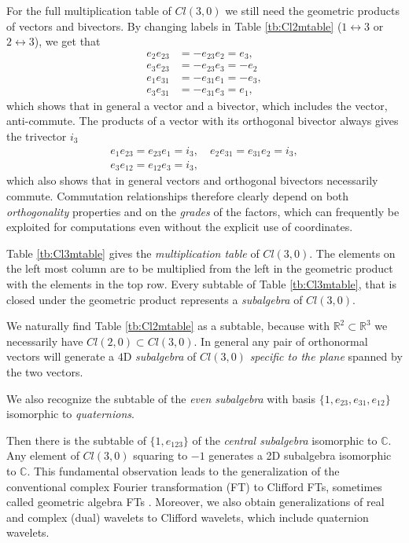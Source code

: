 \documentclass[cameraready]{jcmsi}%
\newcommand{\R}{\mathbb{R}}
\newcommand{\C}{\mathbb{C}}
\begin{document}
For the full multiplication table of $Cl(3,0)$ we still need the geometric products of vectors and bivectors. By changing labels in Table \ref{tb:Cl2mtable} ($1 \leftrightarrow 3$ or $2 \leftrightarrow 3$), we get that
\begin{align} 
  e_2 e_{23} &= - e_{23}e_2 = e_3, 
  \nonumber \\
  e_3 e_{23} &= - e_{23}e_3 = -e_2
  \\
  e_1 e_{31} &= - e_{31}e_1 = -e_3, 
  \nonumber \\
  e_3 e_{31} &= - e_{31}e_3 = e_1,
\end{align} 
which shows that in general a vector and a bivector, which includes the vector, anti-commute. 
The products of a vector with its orthogonal bivector always gives the trivector $i_3$
\begin{gather} 
  e_1 e_{23} = e_{23}e_1 = i_3, \quad
  e_2 e_{31} = e_{31}e_2 = i_3,
  \nonumber \\
  e_3 e_{12} = e_{12}e_3 = i_3,
\end{gather} 
which also shows that in general vectors and orthogonal bivectors necessarily commute. 
Commutation relationships therefore clearly depend on both \textit{orthogonality} properties and on the \textit{grades} of the factors, which can frequently be exploited for computations even without the explicit use of coordinates. 

Table \ref{tb:Cl3mtable} gives the \textit{multiplication table} of $Cl(3,0)$. The elements on the left most column are to be multiplied from the left in the geometric product with the elements in the top row. 
Every subtable of Table \ref{tb:Cl3mtable}, that is closed under the geometric product represents a \textit{subalgebra} of $Cl(3,0)$. 

We naturally find Table \ref{tb:Cl2mtable} as a subtable, because with 
$\R^2 \subset \R^3$ we necessarily have $Cl(2,0) \subset Cl(3,0)$. In general any pair of orthonormal vectors will generate a $4$D \textit{subalgebra} of $Cl(3,0)$ \textit{specific to the plane} spanned by the two vectors.

We also recognize the subtable of the \textit{even subalgebra} with basis $\{1, e_{23}, e_{31}, e_{12}\}$ isomorphic to \textit{quaternions}. 

Then there is the subtable of $\{1, e_{123}\}$ of the \textit{central subalgebra} isomorphic to $\C$. Any element of $Cl(3,0)$ squaring to $-1$ generates a 2D subalgebra isomorphic to $\C$. This fundamental observation leads to the generalization of the conventional complex Fourier transformation (FT) to Clifford FTs, sometimes called geometric algebra FTs \cite{EH:QFTgen}. Moreover, we also obtain generalizations of real and complex (dual) wavelets to Clifford wavelets, which include quaternion wavelets.
\end{document}
